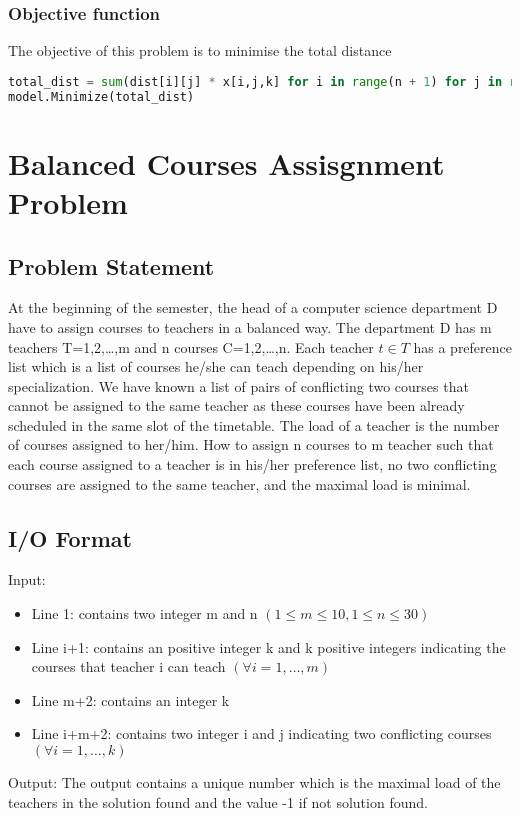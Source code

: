 \documentclass{article}
\begin{document}
\subsubsection{Objective function}
The objective of this problem is to minimise the total distance
\begin{lstlisting}[language=Python]
total_dist = sum(dist[i][j] * x[i,j,k] for i in range(n + 1) for j in range(n + 1) for k in range(K) if i != j)
model.Minimize(total_dist)
\end{lstlisting}

\pagebreak

\section{Balanced Courses Assisgnment Problem}
\subsection{Problem Statement}
At the beginning of the semester, the head of a computer science department D have to assign courses to teachers in a balanced way. The department D has m teachers T={1,2,\dots,m} and n courses C={1,2,\dots,n}. Each teacher $t \in T$ has a preference list which is a list of courses he/she can teach depending on his/her specialization. We have known a list of pairs of conflicting two courses that cannot be assigned to the same teacher as these courses have been already scheduled in the same slot of the timetable. The load of a teacher is the number of courses assigned to her/him. How to assign n courses to m teacher such that each course assigned to a teacher is in his/her preference list, no two conflicting courses are assigned to the same teacher, and the maximal load is minimal.

\subsection{I/O Format}
Input:
\begin{itemize}
    \item Line 1: contains two integer m and n $(1\le m \le 10, 1 \le n \le 30)$
    \item Line i+1: contains an positive integer k and k positive integers indicating the courses that teacher i can teach $(\forall i=1,\ldots,m)$
    \item Line m+2: contains an integer k
    \item Line i+m+2: contains two integer i and j indicating two conflicting courses $(\forall i=1,\ldots,k)$
\end{itemize}
Output: The output contains a unique number which is the maximal load of the teachers in the solution found and the value -1 if not solution found.
\pagebreak
\end{document}
